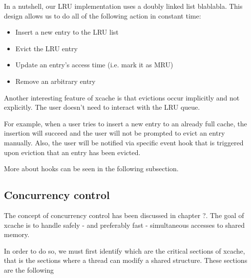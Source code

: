 
In a nutshell, our LRU implementation uses a doubly linked list blablabla.
This design allows us to do all of the following action in constant time:

\begin{itemize}
	\item Insert a new entry to the LRU list
	\item Evict the LRU entry
	\item Update an entry's access time (i.e. mark it as MRU)
	\item Remove an arbitrary entry
\end{itemize}

Another interesting feature of xcache is that evictions occur implicitly and not 
explicitly. The user doesn't need to interact with the LRU queue.

For example, when a user tries to insert a new entry to an already full cache, 
the insertion will succeed and the user will not be prompted to evict an entry 
manually. Also, the user will be notified via specific event hook that is 
triggered upon eviction that an entry has been evicted.

More about hooks can be seen in the following subsection.

\subsection{Concurrency control}

The concept of concurrency control has been discussed in chapter ?. The goal of 
xcache is to handle safely - and preferably fast - simultaneous accesses to 
shared memory.

In order to do so, we must first identify which are the critical sections of 
xcache, that is the sections where a thread can modify a shared structure. These 
sections are the following


